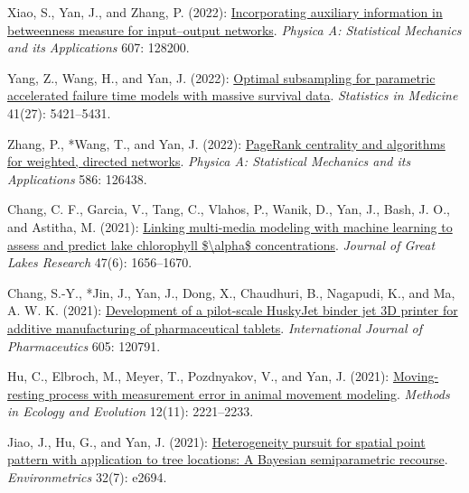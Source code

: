 \begin{RefereedJournalArticles}
\item *Xiao, S., Yan, J., and Zhang, P. (2022):
\href{https://doi.org/10.1016/j.physa.2022.128200}{Incorporating
auxiliary information in betweenness measure for input--output
networks}. \emph{Physica A: Statistical Mechanics and its Applications}
607: 128200.

\item *Yang, Z., Wang, H., and Yan, J. (2022):
\href{https://doi.org/10.1002/sim.9576}{Optimal subsampling for
parametric accelerated failure time models with massive survival data}.
\emph{Statistics in Medicine} 41(27): 5421--5431.

\item Zhang, P., *Wang, T., and Yan, J. (2022):
\href{https://doi.org/10.1016/j.physa.2021.126438}{PageRank centrality
and algorithms for weighted, directed networks}. \emph{Physica A:
Statistical Mechanics and its Applications} 586: 126438.

\item Chang, C. F., Garcia, V., Tang, C., Vlahos, P., Wanik, D., Yan, J.,
Bash, J. O., and Astitha, M. (2021):
\href{https://doi.org/10.1016/j.jglr.2021.09.011}{Linking multi-media
modeling with machine learning to assess and predict lake chlorophyll
\$\textbackslash alpha\$ concentrations}. \emph{Journal of Great Lakes
Research} 47(6): 1656--1670.

\item Chang, S.-Y., *Jin, J., Yan, J., Dong, X., Chaudhuri, B.,
Nagapudi, K., and Ma, A. W. K. (2021):
\href{https://doi.org/10.1016/j.ijpharm.2021.120791}{Development of a
pilot-scale HuskyJet binder jet 3D printer for additive manufacturing of
pharmaceutical tablets}. \emph{International Journal of Pharmaceutics}
605: 120791.

\item *Hu, C., Elbroch, M., Meyer, T., Pozdnyakov, V., and Yan, J.
(2021): \href{https://doi.org/10.1111/2041-210X.13694}{Moving-resting
process with measurement error in animal movement modeling}.
\emph{Methods in Ecology and Evolution} 12(11): 2221--2233.

\item *Jiao, J., Hu, G., and Yan, J. (2021):
\href{https://doi.org/10.1002/env.2694}{Heterogeneity pursuit for
spatial point pattern with application to tree locations: A Bayesian
semiparametric recourse}. \emph{Environmetrics} 32(7): e2694.


\end{RefereedJournalArticles}
